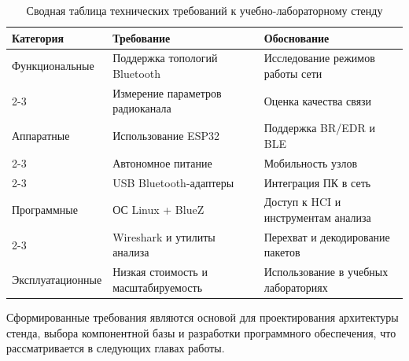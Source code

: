 \begin{table}[H]
\centering
\caption{Сводная таблица технических требований к учебно-лабораторному стенду}
\label{tab:lab_requirements}
\renewcommand{\arraystretch}{1.3}

\begin{tabularx}{\textwidth}{|X|X|X|}
\hline
\textbf{Категория} & \textbf{Требование} & \textbf{Обоснование} \\
\hline

Функциональные &
Поддержка топологий Bluetooth &
Исследование режимов работы сети \\
\cline{2-3}
&
Измерение параметров радиоканала &
Оценка качества связи \\
\hline

Аппаратные &
Использование ESP32 &
Поддержка BR/EDR и BLE \\
\cline{2-3}
&
Автономное питание &
Мобильность узлов \\
\cline{2-3}
&
USB Bluetooth-адаптеры &
Интеграция ПК в сеть \\
\hline

Программные &
ОС Linux + BlueZ &
Доступ к HCI и инструментам анализа \\
\cline{2-3}
&
Wireshark и утилиты анализа &
Перехват и декодирование пакетов \\
\hline

Эксплуатационные &
Низкая стоимость и масштабируемость &
Использование в учебных лабораториях \\
\hline

\end{tabularx}
\end{table}

Сформированные требования являются основой для проектирования архитектуры стенда, выбора компонентной базы и разработки программного обеспечения, что рассматривается в следующих главах работы.
